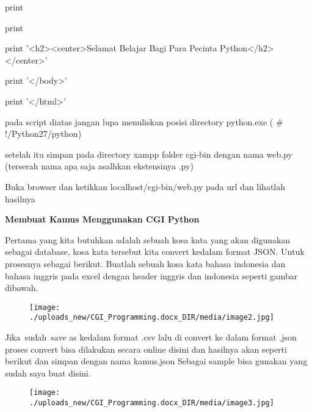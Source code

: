 \documentclass{wileySix}
\begin{document}
\begin{myEnumerate}
	\noindent 
	print \par
	\noindent 
	print \par
	\noindent 
	print '<h2><center>Selamat Belajar Bagi Para Pecinta Python</h2></center>' \par
	\noindent 
	print '</body>' \par
	\noindent 
	print '</html>' \par
	pada script diatas jangan lupa menuliskan posisi directory python.exe ( $  \#  $!/Python27/python) \par
	\noindent 
	setelah itu simpan pada directory xampp folder cgi-bin dengan nama web.py (terserah nama apa saja asalhkan ekstensinya .py) \par
	\noindent 
	\item Buka browser dan ketikkan localhost/cgi-bin/web.py pada url dan lihatlah hasilnya\end{myEnumerate}
\par
\vspace{12pt}
\noindent 
\textbf{Membuat Kamus Menggunakan CGI Python} \par
Pertama yang kita butuhkan adalah sebuah kosa kata yang akan digunakan sebagai database, kosa kata tersebut kita convert kedalam format JSON. Untuk prosesnya sebagai berikut. Buatlah sebuah kosa kata bahasa indonesia dan bahasa inggris pada excel dengan header inggris dan indonesia seperti gambar dibawah. \par
\noindent 
\begin{center}
	
	
	
	\begin{figure}[H]
		\begin{center}
			\texttt{[image: ./uploads\_new/CGI\_Programming.docx\_DIR/media/image2.jpg]}
		\end{center}
	\end{figure}
	
	
	
	
\end{center}\vspace{12pt}
Jika~sudah~save as kedalam format .csv lalu di convert ke dalam format .json proses convert  bisa dilakukan secara online disini dan hasilnya akan seperti berikut dan simpan dengan nama kamus.json Sebagai sample bisa gunakan  yang sudah saya buat disini. \par
\noindent 
\begin{center}
	
	
	
	\begin{figure}[H]
		\begin{center}
			\texttt{[image: ./uploads\_new/CGI\_Programming.docx\_DIR/media/image3.jpg]}
		\end{center}
	\end{figure}
	
	
	
	
\end{center}\vspace{12pt}
\end{document}
